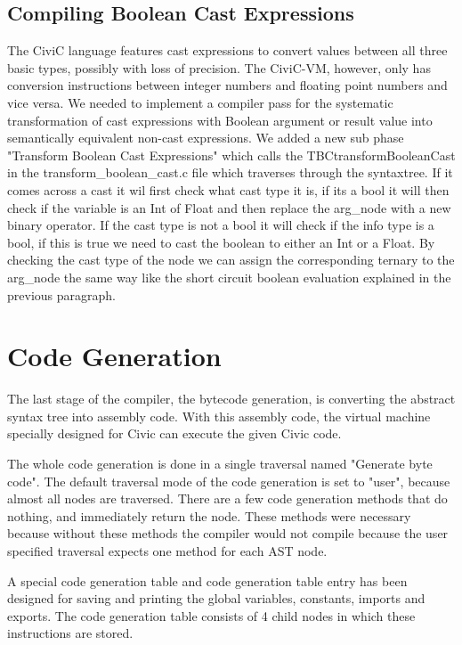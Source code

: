 \documentclass{uva-inf-article}
\begin{document}
\subsection{Compiling Boolean Cast Expressions}
The CiviC language features cast expressions to convert values between all three basic types, possibly 
with loss of precision. The CiviC-VM, however, only has conversion instructions between integer numbers 
and floating point numbers and vice versa. We needed to implement a compiler pass for the systematic 
transformation of cast expressions with Boolean argument or result value into semantically equivalent 
non-cast expressions. We added a new sub phase "Transform Boolean Cast Expressions" which calls the 
TBCtransformBooleanCast in the transform\_boolean\_cast.c file which traverses through the syntaxtree.
If it comes across a cast it wil first check what cast type it is, if its a bool it will then check if the
variable is an Int of Float and then replace the arg\_node with a new binary operator. If the cast type
is not a bool it will check if the info type is a bool, if this is true we need to cast the boolean to 
either an Int or a Float. By checking the cast type of the node we can assign the corresponding ternary
to the arg\_node the same way like the short circuit boolean evaluation explained in the previous paragraph.

\newpage
\section{Code Generation}
\par The last stage of the compiler, the bytecode generation, is converting the abstract syntax tree into assembly code. 
With this assembly code, the virtual machine specially designed for Civic can execute the given Civic code.

\par The whole code generation is done in a single traversal named "Generate byte code".
The default traversal mode of the code generation is set to "user", because almost all nodes are traversed.
There are a few code generation methods that do nothing, and immediately return the node. 
These methods were necessary because without these methods the compiler would not compile because the user specified traversal expects one method for each AST node.

\par A special code generation table and code generation table entry has been designed for saving and printing the global variables, constants, imports and exports. 
The code generation table consists of 4 child nodes in which these instructions are stored.
\end{document}
